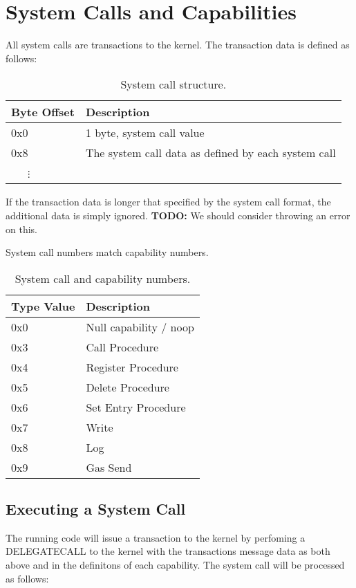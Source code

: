 \documentclass[english,a4paper]{article}
\begin{document}
\section{System Calls and Capabilities}
All system calls are transactions to the kernel. The transaction data is defined
as follows:

\begin{table}[H]
  \caption{System call structure.}
  \centering{}%
  \begin{tabular}{l|p{}}
    \hline
    Byte Offset & Description\tabularnewline
    \hline
    \hline
    0x0 & 1 byte, system call value \tabularnewline
    0x8 & The system call data as defined by each system call \tabularnewline
    ~~~$\vdots$ &  \tabularnewline
    \hline
  \end{tabular}
\end{table}

If the transaction data is longer that specified by the system call format, the
additional data is simply ignored. \textbf{TODO:} We should consider throwing an
error on this.

System call numbers match capability numbers.

\begin{table}[H]
  \caption{System call and capability numbers.\label{syscall-numbers}}
  \centering{}%
  \begin{tabular}{l|p{}}
    \hline
    Type Value & Description\tabularnewline
    \hline
    \hline
    0x0 & Null capability / noop \tabularnewline
    0x3 & Call Procedure \tabularnewline
    0x4 & Register Procedure \tabularnewline
    0x5 & Delete Procedure \tabularnewline
    0x6 & Set Entry Procedure \tabularnewline
    0x7 & Write \tabularnewline
    0x8 & Log \tabularnewline
    0x9 & Gas Send \tabularnewline
    \hline
  \end{tabular}
\end{table}

\subsection{Executing a System Call}
The running code will issue a transaction to the kernel by perfoming a
DELEGATECALL to the kernel with the transactions message data as both above and
in the definitons of each capability. The system call will be processed as
follows:
\end{document}
